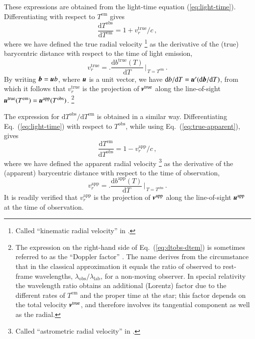 \documentclass{aa}
\def\vec#1{\ensuremath{\mathchoice{\mbox{\boldmath$\displaystyle#1$}}
{\mbox{\boldmath$\textstyle#1$}}
{\mbox{\boldmath$\scriptstyle#1$}}
{\mbox{\boldmath$\scriptscriptstyle#1$}}}}
\begin{document}
These expressions are obtained from the light-time equation (\ref{eq:light-time}).
Differentiating with respect to $T^\mathrm{em}$ gives
\begin{equation}\label{eq:dtobs-dtem}
    \frac{\mathrm{d}T^\mathrm{obs}}
         {\mathrm{d}T^\mathrm{em}}
    =
    1+v_r^\mathrm{true}/c \, ,
\end{equation}
where we have defined the true radial velocity%
\footnote{Called ``kinematic radial velocity'' in \citet{lindegren_dravins2003}.}
as the derivative of the (true) barycentric distance with respect to the time of light emission,
\begin{equation}\label{eq:vr-true}
    v_r^\mathrm{true} =
    \biggl. \frac{\mathrm{d}b^\mathrm{true}(T)}{\mathrm{d}T} \, \biggr|_{\, T=T^\mathrm{em}} \, .
\end{equation}
By writing $\vec{b}=\vec{u}b$, where $\vec{u}$ is a unit vector, we have
$\mathrm{d}b/\mathrm{d}T=\vec{u}'(\mathrm{d}\vec{b}/\mathrm{d}T)$, from which it
follows that $v_r^\mathrm{true}$ is the projection of $\vec{v}^\mathrm{true}$ along the
line-of-sight $\vec{u}^\mathrm{true}(T^\mathrm{em})=\vec{u}^\mathrm{app}(T^\mathrm{obs})$.%
\footnote{The expression on the right-hand side of Eq.~(\ref{eq:dtobs-dtem}) is
sometimes referred to as the ``Doppler factor'' \citep[e.g.][]{stumpff1985}. The name
derives from the circumstance that in the classical approximation it equals the ratio
of observed to rest-frame wavelengths, $\lambda_\mathrm{obs}/\lambda_\mathrm{lab}$,
for a non-moving observer. In special relativity the wavelength ratio obtains an additional
(Lorentz) factor due to the different rates of $T^\mathrm{em}$ and the proper time at
the star; this factor depends on the total velocity $\vec{v}^\mathrm{true}$, and therefore
involves its tangential component as well as the radial.}

The expression for $\mathrm{d}T^\mathrm{obs}/\mathrm{d}T^\mathrm{em}$ is obtained
in a similar way. Differentiating Eq.~(\ref{eq:light-time}) with respect to $T^\mathrm{obs}$,
while using Eq.~(\ref{eq:true-apparent}), gives
\begin{equation}\label{eq:dtem-dtobs}
    \frac{\mathrm{d}T^\mathrm{em}}
         {\mathrm{d}T^\mathrm{obs}}
    =
    1-v_r^\mathrm{app}/c \, ,
\end{equation}
where we have defined the apparent radial velocity%
\footnote{Called ``astrometric radial velocity'' in \citet{lindegren_dravins2003}.}
as the derivative of the (apparent) barycentric distance with respect to the time of observation,
\begin{equation}\label{eq:vr-app}
    v_r^\mathrm{app} =
    \biggl. \frac{\mathrm{d}b^\mathrm{app}(T)}{\mathrm{d}T} \, \biggr|_{\, T=T^\mathrm{obs}} \, .
\end{equation}
It is readily verified that $v_r^\mathrm{app}$ is the projection of $\vec{v}^\mathrm{app}$
along the line-of-sight $\vec{u}^\mathrm{app}$ at the time of observation.
\end{document}
